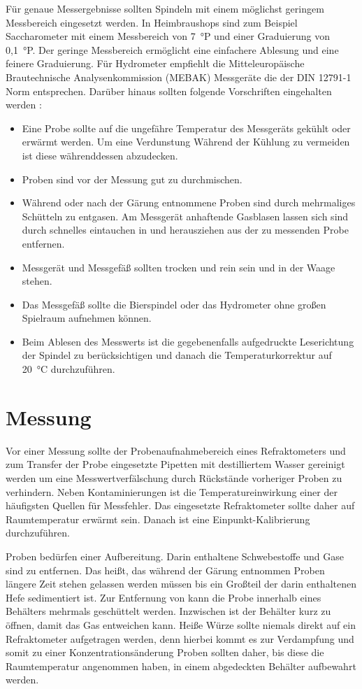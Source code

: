 \documentclass[a4paper,parskip=half]{scrartcl}
\begin{document}
Für genaue Messergebnisse sollten Spindeln mit einem möglichst
geringem Messbereich eingesetzt werden. In Heimbraushops sind
zum Beispiel Saccharometer mit einem Messbereich von 7~°P
und einer Graduierung von 0,1~°P. Der geringe Messbereich
ermöglicht eine einfachere Ablesung und eine feinere Graduierung.
Für Hydrometer empfiehlt die Mitteleuropäische Brautechnische
Analysenkommission (MEBAK) Messgeräte die der DIN 12791-1 Norm
entsprechen. Darüber hinaus sollten folgende Vorschriften
eingehalten werden \autocite{Kunze2004,MEBAK2013,Narziss2009,Wolf2015}:

\begin{itemize}
\item Eine Probe sollte auf die ungefähre Temperatur des
Messgeräts gekühlt oder erwärmt werden. Um eine Verdunstung
Während der Kühlung zu vermeiden ist diese währenddessen
abzudecken.
\item Proben sind vor der Messung gut zu durchmischen.
\item Während oder nach der Gärung entnommene Proben sind
durch mehrmaliges Schütteln zu entgasen. Am Messgerät
anhaftende Gasblasen lassen sich sind durch schnelles eintauchen
in und herausziehen aus der zu messenden Probe entfernen.
\item Messgerät und Messgefäß sollten trocken und rein sein
und in der Waage stehen.
\item Das Messgefäß sollte die Bierspindel oder das Hydrometer
ohne großen Spielraum aufnehmen können.
\item Beim Ablesen des Messwerts ist die gegebenenfalls aufgedruckte
Leserichtung der Spindel zu berücksichtigen und danach die
Temperaturkorrektur auf 20~°C durchzuführen.
\end{itemize}

\section*{Messung}

Vor einer Messung sollte der Probenaufnahmebereich eines Refraktometers
und zum Transfer der Probe eingesetzte Pipetten mit destilliertem Wasser
gereinigt werden um eine Messwertverfälschung durch Rückstände vorheriger
Proben zu verhindern. Neben Kontaminierungen ist die Temperatureinwirkung
einer der häufigsten Quellen für Messfehler. Das eingesetzte Refraktometer
sollte daher auf Raumtemperatur erwärmt sein. Danach ist eine 
Einpunkt-Kalibrierung durchzuführen. \autocite{Depalma2017}

Proben bedürfen einer Aufbereitung. Darin enthaltene Schwebestoffe und
Gase sind zu entfernen. Das heißt, das
während der Gärung entnommen Proben längere Zeit stehen gelassen werden
müssen bis ein Großteil der darin enthaltenen Hefe sedimentiert
ist. Zur Entfernung von  kann die Probe innerhalb eines
Behälters mehrmals geschüttelt werden. Inzwischen ist der Behälter
kurz zu öffnen, damit das Gas entweichen kann. Heiße Würze
sollte niemals direkt auf ein Refraktometer aufgetragen werden,
denn hierbei kommt es zur Verdampfung und somit zu einer
Konzentrationsänderung Proben sollten daher,
bis diese die Raumtemperatur angenommen haben, in einem abgedeckten
Behälter aufbewahrt werden. \autocite{Gamer1959,MEBAK2013,Terrill2013}
\end{document}
